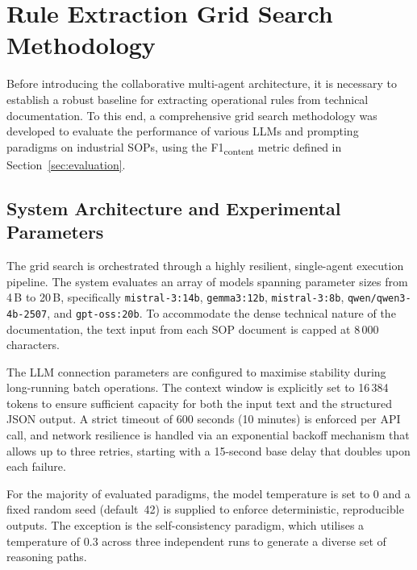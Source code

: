 ﻿\documentclass[11pt]{article}
\begin{document}
\section{Rule Extraction Grid Search Methodology}
\label{sec:grid_search}

Before introducing the collaborative multi-agent architecture, it is necessary to
establish a robust baseline for extracting operational rules from technical
documentation. To this end, a comprehensive grid search methodology was developed
to evaluate the performance of various LLMs and prompting paradigms on industrial
SOPs, using the F1\textsubscript{content} metric defined in
Section~\ref{sec:evaluation}.

\subsection{System Architecture and Experimental Parameters}
The grid search is orchestrated through a highly resilient, single-agent execution
pipeline. The system evaluates an array of models spanning parameter sizes from 4\,B
to 20\,B, specifically \texttt{mistral-3:14b}, \texttt{gemma3:12b},
\texttt{mistral-3:8b}, \texttt{qwen/qwen3-4b-2507}, and \texttt{gpt-oss:20b}.
To accommodate the dense technical nature of the documentation, the text input from
each SOP document is capped at 8\,000 characters.

The LLM connection parameters are configured to maximise stability during
long-running batch operations. The context window is explicitly set to 16\,384
tokens to ensure sufficient capacity for both the input text and the structured JSON
output. A strict timeout of 600 seconds (10 minutes) is enforced per API call, and
network resilience is handled via an exponential backoff mechanism that allows up to
three retries, starting with a 15-second base delay that doubles upon each failure.

For the majority of evaluated paradigms, the model temperature is set to $0$ and a
fixed random seed (default~42) is supplied to enforce deterministic, reproducible
outputs. The exception is the self-consistency paradigm, which utilises a
temperature of $0.3$ across three independent runs to generate a diverse set of
reasoning paths.
\end{document}
